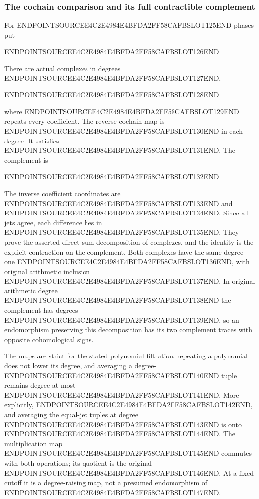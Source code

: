 \subsubsection{The cochain comparison and its full contractible complement}\label{endpoint-holonomy_original--the-cochain-comparison-and-its-full-contractible-complement}

For ENDPOINTSOURCEE4C2E4984E4BFDA2FF58CAFBSLOT125END phases put

ENDPOINTSOURCEE4C2E4984E4BFDA2FF58CAFBSLOT126END

There are actual complexes in degrees ENDPOINTSOURCEE4C2E4984E4BFDA2FF58CAFBSLOT127END,

ENDPOINTSOURCEE4C2E4984E4BFDA2FF58CAFBSLOT128END

where ENDPOINTSOURCEE4C2E4984E4BFDA2FF58CAFBSLOT129END repeats every coefficient. The reverse cochain map is ENDPOINTSOURCEE4C2E4984E4BFDA2FF58CAFBSLOT130END in each degree. It satisfies ENDPOINTSOURCEE4C2E4984E4BFDA2FF58CAFBSLOT131END. The complement is

ENDPOINTSOURCEE4C2E4984E4BFDA2FF58CAFBSLOT132END

The inverse coefficient coordinates are ENDPOINTSOURCEE4C2E4984E4BFDA2FF58CAFBSLOT133END and ENDPOINTSOURCEE4C2E4984E4BFDA2FF58CAFBSLOT134END. Since all jets agree, each difference lies in ENDPOINTSOURCEE4C2E4984E4BFDA2FF58CAFBSLOT135END. They prove the asserted direct-sum decomposition of complexes, and the identity is the explicit contraction on the complement. Both complexes have the same degree-one ENDPOINTSOURCEE4C2E4984E4BFDA2FF58CAFBSLOT136END, with original arithmetic inclusion ENDPOINTSOURCEE4C2E4984E4BFDA2FF58CAFBSLOT137END. In original arithmetic degree ENDPOINTSOURCEE4C2E4984E4BFDA2FF58CAFBSLOT138END the complement has degrees ENDPOINTSOURCEE4C2E4984E4BFDA2FF58CAFBSLOT139END, so an endomorphism preserving this decomposition has its two complement traces with opposite cohomological signs.

The maps are strict for the stated polynomial filtration: repeating a polynomial does not lower its degree, and averaging a degree-ENDPOINTSOURCEE4C2E4984E4BFDA2FF58CAFBSLOT140END tuple remains degree at most ENDPOINTSOURCEE4C2E4984E4BFDA2FF58CAFBSLOT141END. More explicitly, ENDPOINTSOURCEE4C2E4984E4BFDA2FF58CAFBSLOT142END, and averaging the equal-jet tuples at degree ENDPOINTSOURCEE4C2E4984E4BFDA2FF58CAFBSLOT143END is onto ENDPOINTSOURCEE4C2E4984E4BFDA2FF58CAFBSLOT144END. The multiplication map ENDPOINTSOURCEE4C2E4984E4BFDA2FF58CAFBSLOT145END commutes with both operations; its quotient is the original ENDPOINTSOURCEE4C2E4984E4BFDA2FF58CAFBSLOT146END. At a fixed cutoff it is a degree-raising map, not a presumed endomorphism of ENDPOINTSOURCEE4C2E4984E4BFDA2FF58CAFBSLOT147END.

